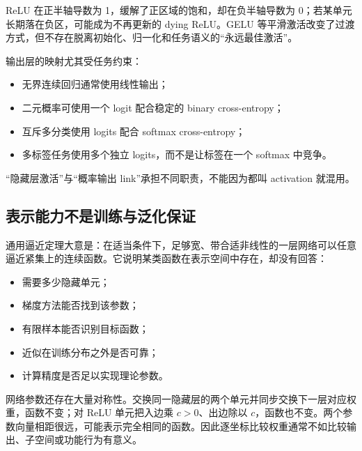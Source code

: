 ReLU 在正半轴导数为 1，缓解了正区域的饱和，却在负半轴导数为 0；若某单元长期落在负区，可能成为不再更新的 dying ReLU。GELU 等平滑激活改变了过渡方式，但不存在脱离初始化、归一化和任务语义的``永远最佳激活''。

输出层的映射尤其受任务约束：

\begin{itemize}
\tightlist
\item
  无界连续回归通常使用线性输出；
\item
  二元概率可使用一个 logit 配合稳定的 binary cross-entropy；
\item
  互斥多分类使用 logits 配合 softmax cross-entropy；
\item
  多标签任务使用多个独立 logits，而不是让标签在一个 softmax 中竞争。
\end{itemize}

``隐藏层激活''与``概率输出 link''承担不同职责，不能因为都叫 activation 就混用。

\subsection{表示能力不是训练与泛化保证}

通用逼近定理大意是：在适当条件下，足够宽、带合适非线性的一层网络可以任意逼近紧集上的连续函数。它说明某类函数在表示空间中存在，却没有回答：

\begin{itemize}
\tightlist
\item
  需要多少隐藏单元；
\item
  梯度方法能否找到该参数；
\item
  有限样本能否识别目标函数；
\item
  近似在训练分布之外是否可靠；
\item
  计算精度是否足以实现理论参数。
\end{itemize}

网络参数还存在大量对称性。交换同一隐藏层的两个单元并同步交换下一层对应权重，函数不变；对 ReLU 单元把入边乘 \(c>0\)、出边除以 \(c\)，函数也不变。两个参数向量相距很远，可能表示完全相同的函数。因此逐坐标比较权重通常不如比较输出、子空间或功能行为有意义。

